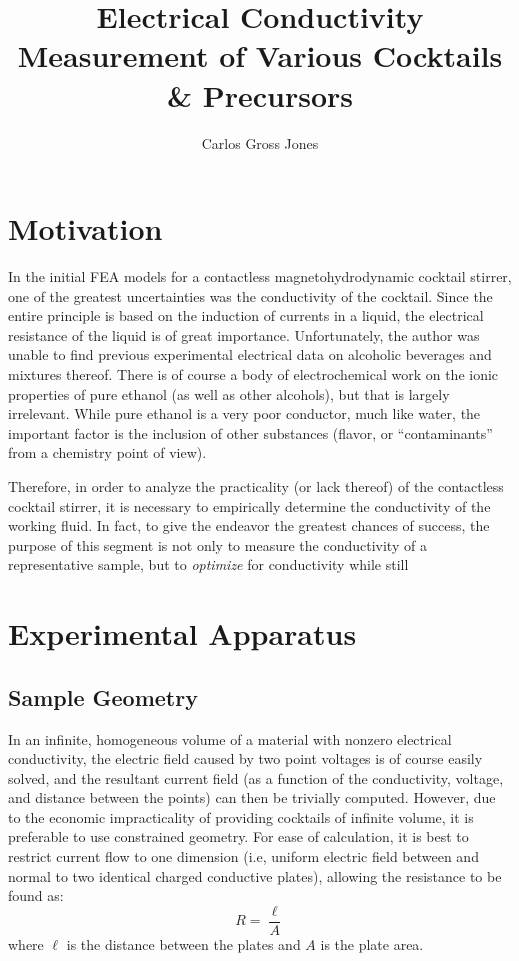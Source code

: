 \documentclass[]{article}
\title{Electrical Conductivity Measurement of Various Cocktails \& Precursors}
\author{Carlos Gross Jones}
\begin{document}
\maketitle

\begin{abstract}

\end{abstract}

\section{Motivation}
\par In the initial FEA models for a contactless magnetohydrodynamic cocktail stirrer, one of the greatest uncertainties was the conductivity of the cocktail. Since the entire principle is based on the induction of currents in a liquid, the electrical resistance of the liquid is of great importance. Unfortunately, the author was unable to find previous experimental electrical data on alcoholic beverages and mixtures thereof. There is of course a body of electrochemical work on the ionic properties of pure ethanol (as well as other alcohols), but that is largely irrelevant. While pure ethanol is a very poor conductor, much like water, the important factor is the inclusion of other substances (flavor, or ``contaminants'' from a chemistry point of view).
\par Therefore, in order to analyze the practicality (or lack thereof) of the contactless cocktail stirrer, it is necessary to empirically determine the conductivity of the working fluid. In fact, to give the endeavor the greatest chances of success, the purpose of this segment is not only to measure the conductivity of a representative sample, but to \textit{optimize} for conductivity while still 
\section{Experimental Apparatus}
\subsection{Sample Geometry}
\par In an infinite, homogeneous volume of a material with nonzero electrical conductivity, the electric field caused by two point voltages is of course easily solved, and the resultant current field (as a function of the conductivity, voltage, and distance between the points) can then be trivially computed. However, due to the economic impracticality of providing cocktails of infinite volume, it is preferable to use constrained geometry. For ease of calculation, it is best to restrict current flow to one dimension (i.e, uniform electric field between and normal to two identical charged conductive plates), allowing the resistance to be found as:
\begin{equation}
R=\frac{\ell}{A}
\end{equation}
where $\ell$ is the distance between the plates and $A$ is the plate area.
\end{document}
